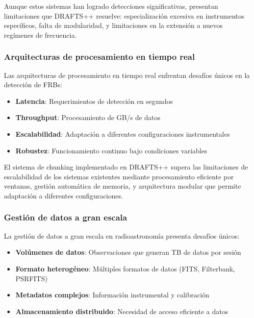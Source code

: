 Aunque estos sistemas han logrado detecciones significativas, presentan limitaciones que DRAFTS++ resuelve: especialización excesiva en instrumentos específicos, falta de modularidad, y limitaciones en la extensión a nuevos regímenes de frecuencia.

\subsubsection{Arquitecturas de procesamiento en tiempo real}

Las arquitecturas de procesamiento en tiempo real enfrentan desafíos únicos en la detección de FRBs:

\begin{itemize}
    \item \textbf{Latencia}: Requerimientos de detección en segundos
    \item \textbf{Throughput}: Procesamiento de GB/s de datos
    \item \textbf{Escalabilidad}: Adaptación a diferentes configuraciones instrumentales
    \item \textbf{Robustez}: Funcionamiento continuo bajo condiciones variables
\end{itemize}

El sistema de chunking implementado en DRAFTS++ supera las limitaciones de escalabilidad de los sistemas existentes mediante procesamiento eficiente por ventanas, gestión automática de memoria, y arquitectura modular que permite adaptación a diferentes configuraciones.

\subsubsection{Gestión de datos a gran escala}

La gestión de datos a gran escala en radioastronomía presenta desafíos únicos:

\begin{itemize}
    \item \textbf{Volúmenes de datos}: Observaciones que generan TB de datos por sesión
    \item \textbf{Formato heterogéneo}: Múltiples formatos de datos (FITS, Filterbank, PSRFITS)
    \item \textbf{Metadatos complejos}: Información instrumental y calibración
    \item \textbf{Almacenamiento distribuido}: Necesidad de acceso eficiente a datos
\end{itemize}

